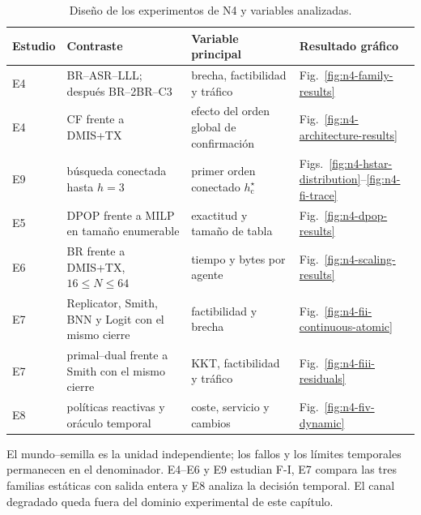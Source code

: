 \begin{table}[H]
\centering
\caption{Diseño de los experimentos de N4 y variables analizadas.}
\label{tab:n4-evidence-programme}
\fontsize{7.7}{8.5}\selectfont
\setlength{\tabcolsep}{1.8pt}
\renewcommand{\arraystretch}{1.08}
\begin{tabularx}{\textwidth}{>{\raggedright\arraybackslash}p{.62cm}
 >{\raggedright\arraybackslash}p{3.15cm}Y
 >{\raggedright\arraybackslash}p{2.25cm}}
\toprule
Estudio & Contraste & Variable principal & Resultado gráfico \\
\midrule
E4 & BR--ASR--LLL; después BR--2BR--C3 & brecha, factibilidad y tráfico &
Fig.~\ref{fig:n4-family-results} \\
E4 & CF frente a DMIS+TX & efecto del orden global de confirmación &
Fig.~\ref{fig:n4-architecture-results} \\
E9 & búsqueda conectada hasta $h=3$ & primer orden conectado $h_{\mathrm c}^\star$ &
Figs.~\ref{fig:n4-hstar-distribution}--\ref{fig:n4-fi-trace} \\
E5 & DPOP frente a MILP en tamaño enumerable & exactitud y tamaño de tabla &
Fig.~\ref{fig:n4-dpop-results} \\
E6 & BR frente a DMIS+TX, $16\le N\le64$ & tiempo y bytes por agente &
Fig.~\ref{fig:n4-scaling-results} \\
E7 & Replicator, Smith, BNN y Logit con el mismo cierre & factibilidad y brecha &
Fig.~\ref{fig:n4-fii-continuous-atomic} \\
E7 & primal--dual frente a Smith con el mismo cierre & KKT, factibilidad y tráfico &
Fig.~\ref{fig:n4-fiii-residuals} \\
E8 & políticas reactivas y oráculo temporal & coste, servicio y cambios &
Fig.~\ref{fig:n4-fiv-dynamic} \\
\bottomrule
\end{tabularx}
\viuownsource
\end{table}

{\small El mundo--semilla es la unidad independiente; los fallos y los límites
temporales permanecen en el denominador. E4--E6 y E9 estudian F-I, E7 compara
las tres familias estáticas con salida entera y E8 analiza la decisión temporal.
El canal degradado queda fuera del dominio experimental de este capítulo.\par}

\clearpage

